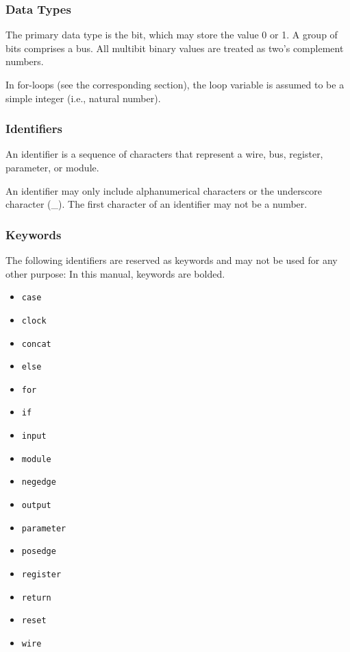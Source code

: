 \documentclass[letterpaper,11pt]{article}
\begin{document}
        \subsubsection{Data Types}
        The primary data type is the bit, which may store the value 0 or 1. A group of bits comprises a bus. All 
        multibit binary values are treated as two's complement numbers.
        
        In for-loops (see the corresponding section), the loop variable is assumed to be a simple integer (i.e., 
        natural number).
        
        \subsubsection{Identifiers}
        An identifier is a sequence of characters that represent a wire, bus, register, parameter, or module. 
        
        An identifier may only include alphanumerical characters or the underscore character (\_). The first character 
        of an identifier may not be a number.
        
        \subsubsection{Keywords}
        The following identifiers are reserved as keywords and may not be used for any other purpose: 
        In this manual, keywords are bolded.
        \begin{itemize}
        \item{\texttt{case}}
        \item{\texttt{clock}}
        \item{\texttt{concat}} 
        \item{\texttt{else}}
        \item{\texttt{for}}
        \item{\texttt{if}}
        \item{\texttt{input}}
        \item{\texttt{module}}
        \item{\texttt{negedge}}
        \item{\texttt{output}}
        \item{\texttt{parameter}}
        \item{\texttt{posedge}}
        \item{\texttt{register}}
        \item{\texttt{return}}
        \item{\texttt{reset}}
        \item{\texttt{wire}}
        \end{itemize}
\end{document}

